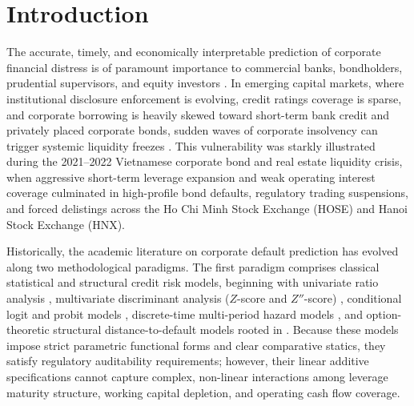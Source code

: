 \documentclass[11pt,a4paper]{article}
\begin{document}
\begin{abstract}
\vspace{0.5em}
\noindent\textbf{Keywords:} Corporate Financial Distress Prediction; Economically-Informed Machine Learning; Monotonic Neural Networks; Structural Credit Risk; Look-Ahead Bias; Vietnamese Listed Firms.
\vspace{0.3em}\\
\noindent\textbf{JEL Classification:} C45, C52, C53, G17, G32, G33.
\end{abstract}

\section{Introduction}
\label{sec:intro}

The accurate, timely, and economically interpretable prediction of corporate financial distress is of paramount importance to commercial banks, bondholders, prudential supervisors, and equity investors \citep{beaver1966financial,altman1968financial,campbell2008search}. In emerging capital markets, where institutional disclosure enforcement is evolving, credit ratings coverage is sparse, and corporate borrowing is heavily skewed toward short-term bank credit and privately placed corporate bonds, sudden waves of corporate insolvency can trigger systemic liquidity freezes \citep{altman1995emerging,pham2018financial,tran2023examining}. This vulnerability was starkly illustrated during the 2021--2022 Vietnamese corporate bond and real estate liquidity crisis, when aggressive short-term leverage expansion and weak operating interest coverage culminated in high-profile bond defaults, regulatory trading suspensions, and forced delistings across the Ho Chi Minh Stock Exchange (HOSE) and Hanoi Stock Exchange (HNX).

Historically, the academic literature on corporate default prediction has evolved along two methodological paradigms. The first paradigm comprises classical statistical and structural credit risk models, beginning with univariate ratio analysis \citep{beaver1966financial}, multivariate discriminant analysis ($Z$-score and $Z''$-score) \citep{altman1968financial,altman1995emerging,altman2017financial}, conditional logit and probit models \citep{ohlson1980financial,zmijewski1984methodological}, discrete-time multi-period hazard models \citep{shumway2001forecasting,chava2004bankruptcy,campbell2008search,bauer2014are}, and option-theoretic structural distance-to-default models rooted in \citet{merton1974pricing} \citep{hillegeist2004assessing,duffie2007multi,bharath2008forecasting}. Because these models impose strict parametric functional forms and clear comparative statics, they satisfy regulatory auditability requirements; however, their linear additive specifications cannot capture complex, non-linear interactions among leverage maturity structure, working capital depletion, and operating cash flow coverage.
\end{document}
